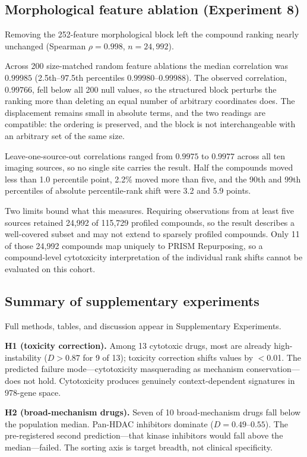 \documentclass[11pt]{article}
\begin{document}
\subsection{Morphological feature ablation (Experiment 8)}

Removing the 252-feature morphological block left the compound ranking nearly
unchanged (Spearman $\rho = 0.998$, $n = 24{,}992$).

Across 200 size-matched random feature ablations the median correlation was
$0.99985$ (2.5th--97.5th percentiles $0.99980$--$0.99988$). The observed
correlation, $0.99766$, fell below all 200 null values, so the structured block
perturbs the ranking more than deleting an equal number of arbitrary
coordinates does. The displacement remains small in absolute terms, and the two
readings are compatible: the ordering is preserved, and the block is not
interchangeable with an arbitrary set of the same size.

Leave-one-source-out correlations ranged from $0.9975$ to $0.9977$ across all
ten imaging sources, so no single site carries the result. Half the compounds
moved less than 1.0 percentile point, 2.2\% moved more than five, and the 90th
and 99th percentiles of absolute percentile-rank shift were 3.2 and 5.9 points.

Two limits bound what this measures. Requiring observations from at least five
sources retained 24{,}992 of 115{,}729 profiled compounds, so the result
describes a well-covered subset and may not extend to sparsely profiled
compounds. Only 11 of those 24{,}992 compounds map uniquely to PRISM
Repurposing, so a compound-level cytotoxicity interpretation of the individual
rank shifts cannot be evaluated on this cohort.

\subsection{Summary of supplementary experiments}

Full methods, tables, and discussion appear in Supplementary Experiments.

\textbf{H1 (toxicity correction).} Among 13 cytotoxic drugs, most are already high-instability ($D > 0.87$
for 9 of 13); toxicity correction shifts values by $<$0.01. The predicted
failure mode---cytotoxicity masquerading as mechanism conservation---does
not hold. Cytotoxicity produces genuinely context-dependent signatures in
978-gene space.

\textbf{H2 (broad-mechanism drugs).} Seven of 10 broad-mechanism drugs fall below the population median.
Pan-HDAC inhibitors dominate ($D = 0.49$--$0.55$). The pre-registered
second prediction---that kinase inhibitors would fall above the
median---failed. The sorting axis is target breadth, not clinical
specificity.
\end{document}
